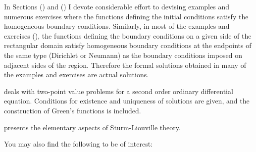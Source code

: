 {In Sections  () and
 () I
devote considerable effort to devising examples and numerous
exercises where the functions defining the initial conditions
satisfy
the homogeneous boundary conditions. Similarly, in most of the
examples and exercises 
(), the functions defining the boundary conditions
on a given side of the rectangular domain satisfy homogeneous
boundary conditions at the endpoints of the same type (Dirichlet or
Neumann) as the boundary conditions imposed on adjacent sides of
the region. Therefore  the formal solutions obtained in many of the
examples and exercises are  actual solutions.

 deals with two-point value problems for
a second order ordinary differential equation. Conditions for
existence
and uniqueness of solutions are given, and the construction
of Green's functions is included.

 presents the elementary aspects of Sturm-Liouville
theory.
}{}%

You may also find the following to be of interest:

